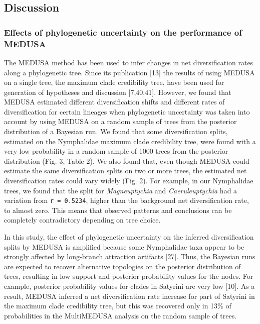 \documentclass[]{article}
\begin{document}
\subsection{Discussion}\label{discussion}

\subsubsection{Effects of phylogenetic uncertainty on the performance of
MEDUSA}\label{effects-of-phylogenetic-uncertainty-on-the-performance-of-medusa}

The MEDUSA method has been used to infer changes in net diversification
rates along a phylogenetic tree. Since its publication {[}13{]} the
results of using MEDUSA on a single tree, the maximum clade credibility
tree, have been used for generation of hypotheses and discussion
{[}7,40,41{]}. However, we found that MEDUSA estimated different
diversification shifts and different rates of diversification for
certain lineages when phylogenetic uncertainty was taken into account by
using MEDUSA on a random sample of trees from the posterior distribution
of a Bayesian run. We found that some diversification splits, estimated
on the Nymphalidae maximum clade credibility tree, were found with a
very low probability in a random sample of 1000 trees from the posterior
distribution (Fig. 3, Table 2). We also found that, even though MEDUSA
could estimate the same diversification splits on two or more trees, the
estimated net diversification rates could vary widely (Fig. 2). For
example, in our Nymphalidae trees, we found that the split for
\emph{Magneuptychia} and \emph{Caeruleuptychia} had a variation from
\texttt{r = 0.5234}, higher than the background net diversification
rate, to almost zero. This means that observed patterns and conclusions
can be completely contradictory depending on tree choice.

In this study, the effect of phylogenetic uncertainty on the inferred
diversification splits by MEDUSA is amplified because some Nymphalidae
taxa appear to be strongly affected by long-branch attraction artifacts
{[}27{]}. Thus, the Bayesian runs are expected to recover alternative
topologies on the posterior distribution of trees, resulting in low
support and posterior probability values for the nodes. For example,
posterior probability values for clades in Satyrini are very low
{[}10{]}. As a result, MEDUSA inferred a net diversification rate
increase for part of Satyrini in the maximum clade credibility tree, but
this was recovered only in 13\% of probabilities in the MultiMEDUSA
analysis on the random sample of trees.
\end{document}
